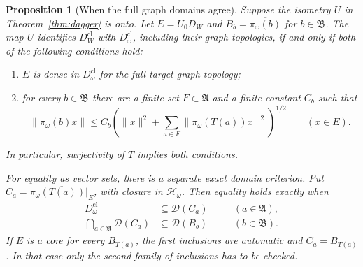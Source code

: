 \documentclass[11pt]{article}
\newtheorem{proposition}[theorem]{Proposition}
\theoremstyle{definition}
\theoremstyle{remark}
\numberwithin{equation}{section}
\begin{document}
\begin{proposition}[When the full graph domains agree]
\label{prop:full-graph-transfer}
Suppose the isometry $U$ in Theorem~\ref{thm:dagger} is onto.
Let $E=U_0D_W$ and $B_b=\overline{\pi_\omega(b)}$ for
$b\in\mathfrak B$.  The map $U$ identifies $D_W^{\mathrm{cl}}$ with
$D_\omega^{\mathrm{cl}}$, including their graph topologies, if and only if
both of the following conditions hold:
\begin{enumerate}
\item $E$ is dense in $D_\omega^{\mathrm{cl}}$ for the full target graph
      topology;
\item for every $b\in\mathfrak B$ there are a finite set
      $F\subset\mathfrak A$ and a finite constant $C_b$ such that
\begin{equation}
 \|\pi_\omega(b)x\|
 \leq C_b\left(\|x\|^2+
          \sum_{a\in F}\|\pi_\omega(T(a))x\|^2\right)^{1/2}
 \qquad(x\in E).
 \label{eq:full-graph-control}
\end{equation}
\end{enumerate}
In particular, surjectivity of $T$ implies both conditions.

For equality as vector sets, there is a separate exact domain criterion.
Put $C_a=\overline{\pi_\omega(T(a))|_E}$, with closure in
$\mathcal H_\omega$.  Then equality holds exactly when
\begin{equation}
 \begin{aligned}
 D_\omega^{\mathrm{cl}}&\subseteq\mathcal D(C_a)
       &&\quad(a\in\mathfrak A),\\
 \bigcap_{a\in\mathfrak A}\mathcal D(C_a)
       &\subseteq\mathcal D(B_b)
       &&\quad(b\in\mathfrak B).
 \end{aligned}
 \label{eq:full-graph-domain-test}
\end{equation}
If $E$ is a core for every $B_{T(a)}$, the first inclusions are automatic
and $C_a=B_{T(a)}$.  In that case only the second family of inclusions
has to be checked.
\end{proposition}
\end{document}
